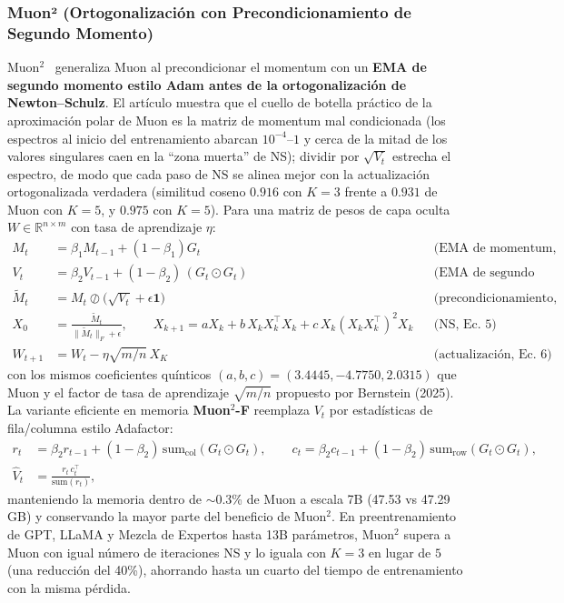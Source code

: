 \subsubsection{Muon² (Ortogonalización con Precondicionamiento de Segundo Momento)}
Muon$^2$~\citep{liu_muon2_2026} generaliza Muon al precondicionar el momentum con un
\textbf{EMA de segundo momento estilo Adam antes de la ortogonalización de
Newton--Schulz}. El artículo muestra que el cuello de botella práctico de la aproximación
polar de Muon es la matriz de momentum mal condicionada (los espectros al inicio del
entrenamiento abarcan $10^{-4}$--$1$ y cerca de la mitad de los valores singulares caen en
la ``zona muerta'' de NS); dividir por $\sqrt{V_t}$ estrecha el espectro, de modo que cada
paso de NS se alinea mejor con la actualización ortogonalizada verdadera (similitud coseno
$0.916$ con $K{=}3$ frente a $0.931$ de Muon con $K{=}5$, y $0.975$ con $K{=}5$). Para una
matriz de pesos de capa oculta $W \in \mathbb{R}^{n \times m}$ con tasa de aprendizaje
$\eta$:
\begin{align}
M_t &= \beta_1 M_{t-1} + (1-\beta_1) G_t && \text{(EMA de momentum, Ec.~2)} \\
V_t &= \beta_2 V_{t-1} + (1-\beta_2)\, (G_t \odot G_t) && \text{(EMA de segundo momento, Ec.~3)} \\
\widetilde{M}_t &= M_t \oslash \big(\sqrt{V_t} + \epsilon \mathbf{1}\big) && \text{(precondicionamiento, Ec.~4)} \\
X_0 &= \frac{\widetilde{M}_t}{\|\widetilde{M}_t\|_F + \epsilon}, \qquad
X_{k+1} = aX_k + b\, X_k X_k^\top X_k + c\, X_k (X_k X_k^\top)^2 X_k && \text{(NS, Ec.~5)} \\
W_{t+1} &= W_t - \eta \sqrt{m/n}\, X_K && \text{(actualización, Ec.~6)}
\end{align}
con los mismos coeficientes quínticos $(a,b,c)=(3.4445,-4.7750,2.0315)$ que Muon y el
factor de tasa de aprendizaje $\sqrt{m/n}$ propuesto por Bernstein (2025). La variante
eficiente en memoria \textbf{Muon$^2$-F} reemplaza $V_t$ por estadísticas de fila/columna
estilo Adafactor:
\begin{align}
r_t &= \beta_2 r_{t-1} + (1-\beta_2)\,\mathrm{sum}_{\mathrm{col}}(G_t \odot G_t), \qquad
c_t = \beta_2 c_{t-1} + (1-\beta_2)\,\mathrm{sum}_{\mathrm{row}}(G_t \odot G_t), \\
\widehat{V}_t &= \frac{r_t\, c_t^\top}{\mathrm{sum}(r_t)},
\end{align}
manteniendo la memoria dentro de $\sim$0.3\% de Muon a escala 7B (47.53 vs 47.29 GB) y
conservando la mayor parte del beneficio de Muon$^2$. En preentrenamiento de GPT, LLaMA y
Mezcla de Expertos hasta 13B parámetros, Muon$^2$ supera a Muon con igual número de
iteraciones NS y lo iguala con $K{=}3$ en lugar de $5$ (una reducción del 40\%), ahorrando
hasta un cuarto del tiempo de entrenamiento con la misma pérdida.

